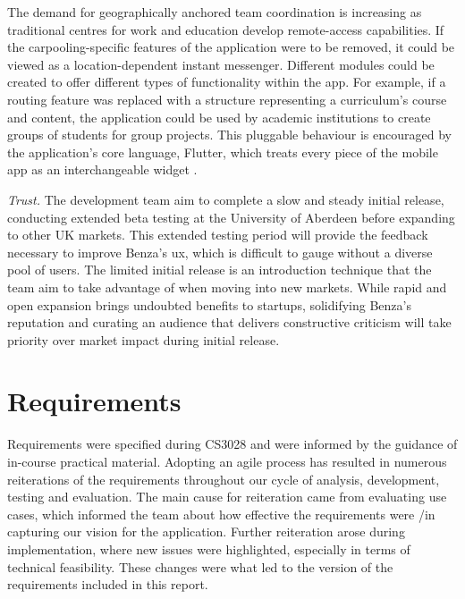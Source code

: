 \documentclass{article}
\begin{document}
    The demand for geographically anchored team coordination is increasing as traditional centres for work and education develop remote-access capabilities. If the carpooling-specific features of the application were to be removed, it could be viewed as a location-dependent instant messenger. Different modules could be created to offer different types of functionality within the \gls{app}. For example, if a routing feature was replaced with a structure representing a curriculum's course and content, the application could be used by academic institutions to create groups of students for group projects. This \gls{pluggable} behaviour is encouraged by the application's core language, Flutter, which treats every piece of the mobile app as an interchangeable widget \cite{fluttereverythingsawidget}.\par
    
    \emph{Trust.} The development team aim to complete a slow and steady initial release, conducting extended beta testing at the University of Aberdeen before expanding to other UK markets. This extended testing period will provide the feedback necessary to improve Benza's \acrshort{ux}, which is difficult to gauge without a diverse pool of users. The limited initial release is an introduction technique that the team aim to take advantage of when moving into new markets. While rapid and open expansion brings undoubted benefits to startups, solidifying Benza's reputation and curating an audience that delivers constructive criticism will take priority over market impact during initial release. \par

  
\newpage
\section{Requirements}
\label{sec:requirements}
    
    Requirements were specified during CS3028 and were informed by the guidance of in-course practical material. Adopting an agile process has resulted in numerous reiterations of the requirements throughout our cycle of analysis, development, testing and evaluation. The main cause for reiteration came from evaluating use cases, which informed the team about how effective the requirements were /in capturing our vision for the application. Further reiteration arose during implementation, where new issues were highlighted, especially in terms of technical feasibility. These changes were what led to the version of the requirements included in this report. \par
    
\end{document}
